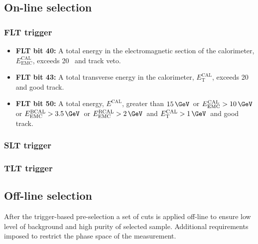 \subsection{On-line selection}
\label{subsec:onlineselect}

\subsubsection{FLT trigger}
\label{subsubsec:fltcuts}
\begin{itemize}
	\item \textbf{FLT bit 40:} A total energy in the electromagnetic section of the calorimeter, $E_\text{EMC}^\text{CAL}$, exceeds 20 \GeV\, and track veto.
	\item \textbf{FLT bit 43:} A total transverse energy in the calorimeter, $E_\text{T}^\text{CAL}$, exceeds 20 \GeV\, and good track.
	\item \textbf{FLT bit 50:} A total energy, $E^\text{CAL}$, greater than $15\, \GeV$\, or $E_\text{EMC}^\text{CAL} > 10\, \GeV\,$ or $E_\text{EMC}^\text{BCAL} > 3.5\, \GeV$\, or $E_\text{EMC}^\text{RCAL} > 2\, \GeV$\, and $E_\text{T}^\text{CAL} > 1\, \GeV$\, and good track.
\end{itemize}

\subsubsection{SLT trigger}
\label{subsubsec:sltcuts}

\subsubsection{TLT trigger}
\label{subsubsec:tltcuts}

\subsection{Off-line selection}
\label{subsec:offlineselect}

After the trigger-based pre-selection a set of cuts is applied off-line to ensure low level of background and high purity of selected sample. Additional requirements imposed to restrict the phase space of the measurement. 

